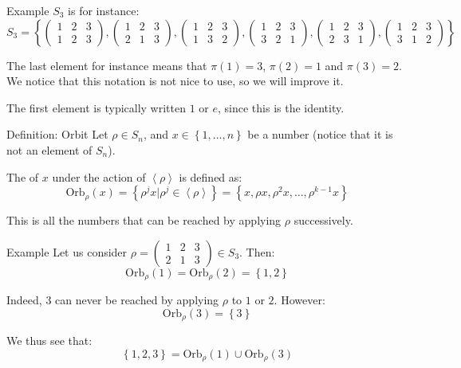 \documentclass[a4paper]{article}
\begin{document}
\begin{parag}{Example}
    $S_3$ is for instance:
    \[S_3 = \left\{\begin{pmatrix} 1 & 2 & 3 \\ 1 & 2 & 3 \end{pmatrix} , \begin{pmatrix} 1 & 2 & 3 \\ 2 & 1 & 3 \end{pmatrix} , \begin{pmatrix}  1 & 2 & 3 \\1 & 3 & 2 \end{pmatrix} , \begin{pmatrix}  1 & 2 & 3 \\3 & 2 & 1 \end{pmatrix} , \begin{pmatrix}  1 & 2 & 3 \\2 & 3 & 1 \end{pmatrix} , \begin{pmatrix}  1 & 2 & 3 \\3 & 1 & 2 \end{pmatrix} \right\}\]
    
    The last element for instance means that $\pi\left(1\right) = 3$, $\pi\left(2\right) = 1$ and $\pi\left(3\right) = 2$. We notice that this notation is not nice to use, so we will improve it.


    The first element is typically written $1$ or $e$, since this is the identity.
\end{parag}

\begin{parag}{Definition: Orbit}
    Let $\rho \in S_n$, and $x \in \left\{1, \ldots, n\right\}$ be a number (notice that it is not an element of $S_n$).

    The  of $x$ under the action of $\left\langle \rho \right\rangle$ is defined as: 
    \[\text{Orb}_{\rho}\left(x\right) = \left\{\rho^j x | \rho^j \in \left\langle \rho \right\rangle\right\} = \left\{x, \rho x, \rho^2 x, \ldots, \rho^{k-1} x\right\}\]

    This is all the numbers that can be reached by applying $\rho$ successively.
    
    \begin{subparag}{Example}
        Let us consider $\rho = \begin{pmatrix} 1 & 2 & 3 \\ 2 & 1 & 3 \end{pmatrix} \in S_3$. Then: 
        \[\text{Orb}_{\rho}\left(1\right) = \text{Orb}_{\rho}\left(2\right) = \left\{1, 2\right\}\]
        
        Indeed, $3$ can never be reached by applying $\rho$ to $1$ or $2$. However: 
        \[\text{Orb}_{\rho}\left(3\right) = \left\{3\right\}\]

        We thus see that: 
        \[\left\{1, 2, 3\right\} = \text{Orb}_\rho\left(1\right) \cup \text{Orb}_{\rho}\left(3\right)\]
    \end{subparag}
\end{parag}
\end{document}
